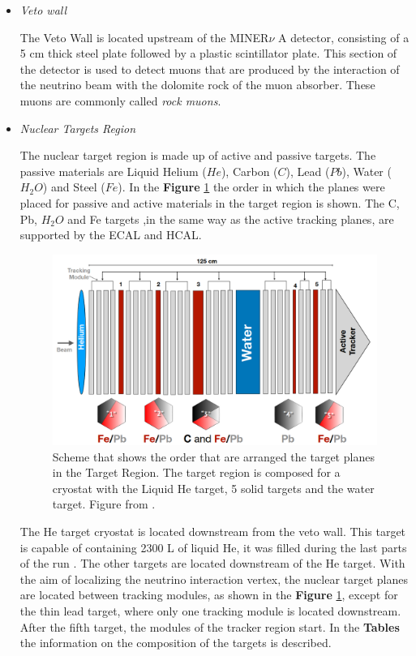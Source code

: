 \begin{itemize}
    \item \textit{Veto wall}

    The Veto Wall is located upstream of the MINER$\nu$ A detector, consisting of a 5 cm thick steel plate followed by a plastic scintillator plate. This section of the detector is used to detect muons that are produced by the interaction of the neutrino beam with the dolomite rock of the muon absorber. These muons are commonly called \textit{rock muons}.

    \item \textit{Nuclear Targets Region}

    The nuclear target region is made up of active and passive targets. The passive materials are Liquid Helium ($He$), Carbon ($C$), Lead ($Pb$), Water ($H_2O$) and Steel ($Fe$). In the \textbf{Figure} \ref{fig:MnvExp:MnvDetector:TargetRegion} the order in which the planes were placed for passive and active materials in the target region is shown. The C, Pb, $H_2O$ and Fe targets ,in the same way as the active tracking planes, are supported by the ECAL and HCAL.
    
    \begin{figure}[!htb]
    \centering
    \includegraphics[scale=0.35]{Figures/Chapter2/TargetRegion1.png}

        \caption{Scheme that shows the order that are arranged the target planes in the Target Region. The target region is composed for a cryostat with the Liquid He target, 5 solid targets and the water target. Figure from \cite{MarvinThesis}.} 
    \label{fig:MnvExp:MnvDetector:TargetRegion}
    \end{figure}
    
    The He target cryostat is located downstream from the veto wall. This target is capable of containing 2300 L of liquid He, it was filled during the last parts of the run \cite{MINERvA}. The other targets are located downstream of the He target. With the aim of localizing the neutrino interaction vertex, the nuclear target planes are located between tracking modules, as shown in the \textbf{Figure} \ref{fig:MnvExp:MnvDetector:TargetRegion}, except for the thin lead target, where only one tracking module is located downstream. After the fifth target, the modules of the tracker region start. In the \textbf{Tables} the information on the composition of the targets is described. 


\end{itemize}
